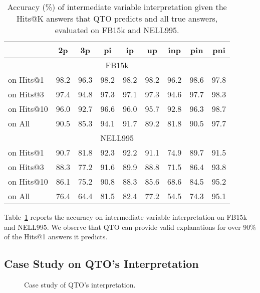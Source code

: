 \begin{table}[t]
    \centering
    \begin{tabular}{lcccccccc}
        \toprule
        & \bf{2p} & \bf{3p} & \bf{pi} & \bf{ip} & \bf{up} & \bf{inp} & \bf{pin} & \bf{pni} \\
        \midrule
        \multicolumn{9}{c}{FB15k} \\
        \midrule
        on Hits@1 & 98.2 & 96.3 & 98.2 & 98.2 & 98.2 & 96.2 & 98.6 & 97.8 \\
        on Hits@3 & 97.4 & 94.8 & 97.3 & 97.1 & 97.3 & 94.6 & 97.7 & 98.3 \\
        on Hits@10 & 96.0 & 92.7 & 96.6 & 96.0 & 95.7 & 92.8 & 96.3 & 98.7 \\
        on All & 90.5 & 85.3 & 94.1 & 91.7 & 89.2 & 81.8 & 90.5 & 97.7 \\
        \midrule
        \multicolumn{9}{c}{NELL995} \\
        \midrule
        on Hits@1 & 90.7 & 81.8 & 92.3 & 92.2 & 91.1 & 74.9 & 89.7 & 91.5 \\
        on Hits@3 & 88.3 & 77.2 & 91.6 & 89.9 & 88.8 & 71.5 & 86.4 & 93.8 \\
        on Hits@10 & 86.1 & 75.2 & 90.8 & 88.3 & 85.6 & 68.6 & 84.5 & 95.2 \\
        on All & 76.4 & 64.4 & 81.5 & 82.4 & 77.2 & 54.5 & 74.3 & 95.1 \\
        \bottomrule
    \end{tabular}
    \caption{Accuracy (\%) of intermediate variable interpretation given the Hits@K answers that QTO predicts and all true answers, evaluated on FB15k and NELL995.}
    \label{tb:interpretability1}
\end{table}

Table~\ref{tb:interpretability1} reports the accuracy on intermediate variable interpretation on FB15k and NELL995.
We observe that QTO can provide valid explanations for over 90\% of the Hits@1 answers it predicts.

\subsection{Case Study on QTO's Interpretation}
\label{app:case}

\begin{figure}[htbp]
    \centering
    \quad
    \quad
    \quad
\caption{Case study of QTO's interpretation.}
\label{fig:case}
\end{figure}

